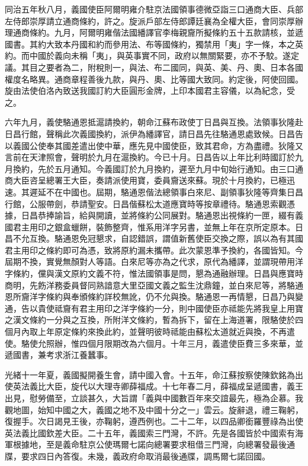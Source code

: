 \begin{pinyinscope}
同治五年秋八月，義國使臣阿爾明雍介駐京法國領事德微亞詣三口通商大臣、兵部左侍郎崇厚請立通商條約，許之。旋派戶部左侍郎譚廷襄為全權大臣，會同崇厚辦理通商條約。九月，阿爾明雍偕法國繙譯官李梅親齎所擬條約五十五款請核，並遞國書。其約大致本丹國和約而參用法、布等國條約，獨禁用「夷」字一條，本之英約。而中國於義向未稱「夷」，與英事實不同，政府以無關緊要，亦不予駮。遂定議。其目之要者為二，附稅則一，與法、布二國同，與英、美、丹、奧、日本各國權度名略異。通商章程善後九款，與丹、奧、比等國大致同。約定後，阿使回國。旋由法使伯洛內致送我國訂約大臣圓形金牌，上印本國君主容儀，以為紀念，受之。

六年九月，義使駱通恩抵滬請換約，朝命江蘇布政使丁日昌與互換。法領事狄隆赴日昌行館，聲稱此次義國換約，派伊為繙譯官，請日昌先往駱通恩處致候。日昌告以義國公使奉其國差遣出使中華，應先見中國使臣，致其君命，方為盡禮。狄隆又言前在天津照會，聲明於九月在滬換約。今已十月。日昌告以上年比利時國訂於九月換約，先於五月通知。今義國訂於九月換約，遲至九月中旬始行通知。由三口通商大臣咨呈總署王大臣，奏請派使用寶，委員齎送來蘇。現於十月換約，已極迅速。其遲延不在中國也。屆期，駱通恩偕法總領事白來尼、副領事狄隆等齊集日昌行館，公服帶劍，恭請聖安。日昌偕蘇松太道應寶時等按章禮待。駱通恩索觀憑據，日昌恭捧諭旨，給與開讀，並將條約公同展對。駱通恩出視條約一匣，綴有義國君主用印之銀盒蠟餅，裝飾整齊，惟系用洋字另書，並無上年在京所定原本。日昌不允互換。駱通恩免冠懇求，自認錯誤，謂值新舊使臣交換之際，誤以為有其國君主用印之條約即可為憑，致將原約漏未攜帶。此次蒙恩準予換約，各國皆知。今屆期不換，實覺無顏對人等語。白來尼等亦為之代求，原代為繙譯，並謂現帶用洋字條約，儻與漢文原約文義不符，惟法國領事是問，懇為通融辦理。日昌與應寶時商明，先飭洋務委員督同熟諳意大里亞國文義之監生沈鼎鐘，並白來尼等，將駱通恩所齎洋字條約與奉頒條約詳校無訛，仍不允與換。駱通恩一再情懇，日昌乃與變通，告以貴使祗齎有君主用印之洋字條約一分，則中國使臣亦祗能先將我皇上用寶之漢文條約一分與之互換，所附洋文條約，暫為拆下，留在上海道署，限駱使於四個月內取上年原定條約來換此約，並聲明彼時祗能由蘇松太道就近與換，不再遣使。駱使允照辦，惟四個月限期改為六個月。十年三月，義遣使臣費三多來華，並遞國書，兼考求浙江養蠶事。

光緒十一年夏，義國擬開養生會，請中國入會。十五年，命江蘇按察使陳欽銘為出使英法義比大臣，旋代以大理寺卿薛福成。十七年春二月，薛福成呈遞國書，義王出見，慰勞備至，立談甚久，大旨謂「義與中國數百年來交誼最先，極為企慕。我觀地圖，始知中國之大，義國之地不及中國十分之一」雲云。旋辭退，禮三鞠躬，復握手。次日謁見王後，亦鞠躬，遵西例也。二十二年，以四品卿銜羅豐祿為出使英法義比國欽差大臣。二十五年，義國索三門灣，不許。先是各國皆於中國索有海軍根據地，至是義命駐京公使瑪爾七諾向總署要求租借三門灣，向總署發最後通牒，要求四日內答復。未幾，義政府命取消最後通牒，調馬爾七諾回國。


\end{pinyinscope}
